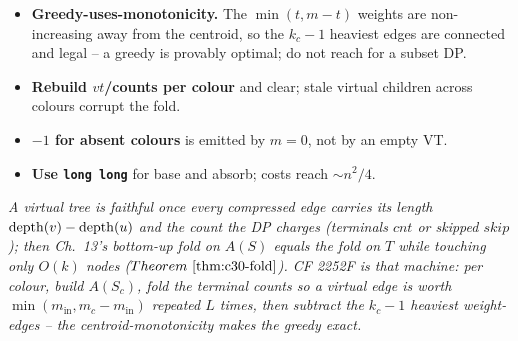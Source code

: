\begin{hardeningbox}
\begin{itemize}[nosep,leftmargin=1.4em]
  \item \textbf{Greedy-uses-monotonicity.} The \(\min(t,m-t)\) weights are non-increasing
        away from the centroid, so the \(k_c-1\) heaviest edges are connected and legal --
        a greedy is provably optimal; do not reach for a subset DP.
  \item \textbf{Rebuild \(\mathit{vt}\)/counts per colour} and clear; stale virtual
        children across colours corrupt the fold.
  \item \textbf{\(-1\) for absent colours} is emitted by \(m=0\), not by an empty VT.
  \item \textbf{Use \texttt{long long}} for base and absorb; costs reach \(\sim n^2/4\).
\end{itemize}
\end{hardeningbox}

\begin{recallbox}
\emph{A virtual tree is faithful once every compressed edge carries its length
\(\operatorname{depth}(v)-\operatorname{depth}(u)\) and the count the DP charges (terminals \(\mathit{cnt}\) or
skipped \(\mathit{skip}\)); then Ch.~13's bottom-up fold on \(A(S)\) equals the fold on
\(T\) while touching only \(O(k)\) nodes (\(\thmref{c30-fold}\)).  CF 2252F is that
machine: per colour, build \(A(S_c)\), fold the terminal counts so a virtual edge is
worth \(\min(m_{\text{in}},m_c-m_{\text{in}})\) repeated \(L\) times, then subtract the
\(k_c-1\) heaviest weight-edges -- the centroid-monotonicity makes the greedy exact.}
\end{recallbox}
